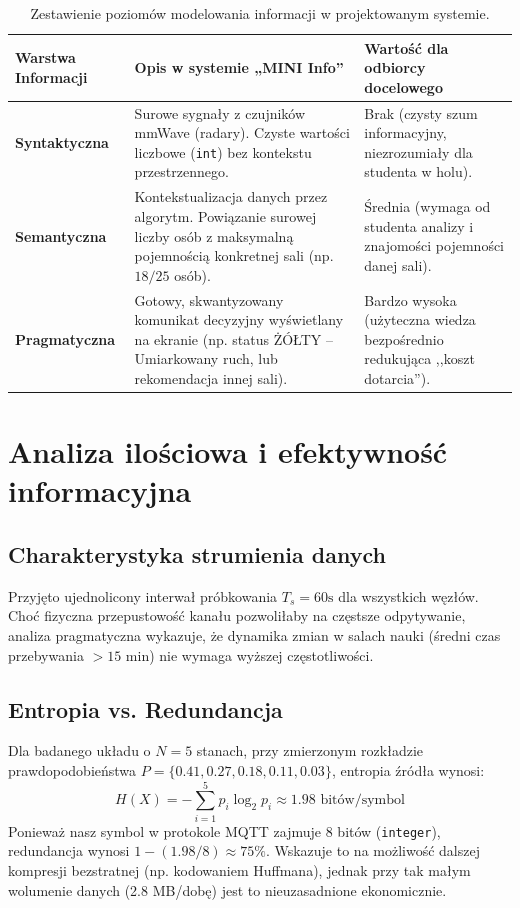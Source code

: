 \documentclass[14pt,a4paper]{extarticle}
\begin{document}
\begin{table}[H]
    \centering
    \renewcommand{\arraystretch}{1.5}
    \begin{tabular}{|>{\raggedright\arraybackslash}p{3cm}|>{\raggedright\arraybackslash}p{6cm}|>{\raggedright\arraybackslash}p{5.5cm}|}
    \hline
    \rowcolor{gray!20}
    \textbf{Warstwa Informacji} & \textbf{Opis w systemie „MINI Info”} & \textbf{Wartość dla odbiorcy docelowego} \\ \hline
    \textbf{Syntaktyczna} & Surowe sygnały z czujników mmWave (radary). Czyste wartości liczbowe (\texttt{int}) bez kontekstu przestrzennego. & Brak (czysty szum informacyjny, niezrozumiały dla studenta w holu). \\ \hline
    \textbf{Semantyczna} & Kontekstualizacja danych przez algorytm. Powiązanie surowej liczby osób z maksymalną pojemnością konkretnej sali (np. $18/25$ osób). & Średnia (wymaga od studenta analizy i znajomości pojemności danej sali). \\ \hline
    \textbf{Pragmatyczna} & Gotowy, skwantyzowany komunikat decyzyjny wyświetlany na ekranie (np. status ŻÓŁTY -- Umiarkowany ruch, lub rekomendacja innej sali). & Bardzo wysoka (użyteczna wiedza bezpośrednio redukująca ,,koszt dotarcia''). \\ \hline
    \end{tabular}
    \vspace{0.2cm}
    \caption{Zestawienie poziomów modelowania informacji w projektowanym systemie.}
    \label{tab:poziomy_informacji}
\end{table}
\section{Analiza ilościowa i efektywność informacyjna}

\subsection{Charakterystyka strumienia danych}
Przyjęto ujednolicony interwał próbkowania $T_s = 60\text{s}$ dla wszystkich węzłów. Choć fizyczna przepustowość kanału pozwoliłaby na częstsze odpytywanie, analiza pragmatyczna wykazuje, że dynamika zmian w salach nauki (średni czas przebywania $>15$ min) nie wymaga wyższej częstotliwości.

\subsection{Entropia vs. Redundancja}
Dla badanego układu o $N=5$ stanach, przy zmierzonym rozkładzie prawdopodobieństwa $P = \{0.41, 0.27, 0.18, 0.11, 0.03\}$, entropia źródła wynosi:
\begin{equation}
H(X) = -\sum_{i=1}^{5} p_i \log_2 p_i \approx 1.98 \text{ bitów/symbol}
\end{equation}
Ponieważ nasz symbol w protokole MQTT zajmuje 8 bitów (\texttt{integer}), redundancja wynosi $1 - (1.98/8) \approx 75\%$. Wskazuje to na możliwość dalszej kompresji bezstratnej (np. kodowaniem Huffmana), jednak przy tak małym wolumenie danych (2.8 MB/dobę) jest to nieuzasadnione ekonomicznie.
\end{document}
